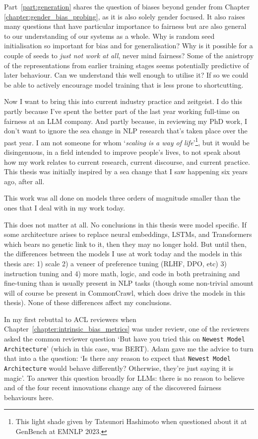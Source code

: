 Part~\ref{part:generation} shares the question of biases beyond gender from Chapter \ref{chapter:gender_bias_probing}, as it is also solely gender focused. It also raises many questions that have particular importance to fairness but are also general to our understanding of our systems as a whole. Why is random seed initialisation so important for bias and for generalisation? Why is it possible for a couple of seeds to \textit{just not work at all}, never mind fairness? Some of the anistropy of the representations from earlier training stages seems potentially predictive of later behaviour. Can we understand this well enough to utilise it? If so we could be able to actively encourage model training that is less prone to shortcutting. 

Now I want to bring this into current industry practice and zeitgeist. I do this partly because I've spent the better part of the last year working full-time on fairness at an LLM company. And partly because, in reviewing my PhD work, I don't want to ignore the sea change in NLP research that's taken place over the past year. I am not someone for whom `\textit{scaling is a way of life}'\footnote{This light shade given by Tatsunori Hashimoto when questioned about it at GenBench at EMNLP 2023.}, but it would be disingenuous, in a field intended to improve people's lives, to not speak about how my work relates to current research, current discourse, and current practice. This thesis was initially inspired by a sea change that I saw happening six years ago, after all. 

This work was all done on models three orders of magnitude smaller than the ones that I deal with in my work today. 

This does not matter at all. No conclusions in this thesis were model specific. If some architecture arises to replace neural embeddings, LSTMs, and Transformers which bears no genetic link to it, then they may no longer hold. But until then, the differences between the models I use at work today and the models in this thesis are: 1) scale 2) a veneer of preference tuning (RLHF, DPO, etc) 3) instruction tuning \citep{} and 4) more math, logic, and code in both pretraining and fine-tuning than is usually present in NLP tasks (though some non-trivial amount will of course be present in CommonCrawl, which does drive the models in this thesis). None of these differences affect my conclusions. 

In my first rebuttal to ACL reviewers when Chapter~\ref{chapter:intrinsic_bias_metrics} was under review, one of the reviewers asked the common reviewer question `But have you tried this on {\tt Newest Model Architecture}' (which in this case, was BERT). Adam gave me the advice to turn that into a the question: `Is there any reason to expect that {\tt Newest Model Architecture} would behave differently? Otherwise, they're just saying it is magic'. To answer this question broadly for LLMs: there is no reason to believe and of the four recent innovations change any of the discovered fairness behaviours here.

